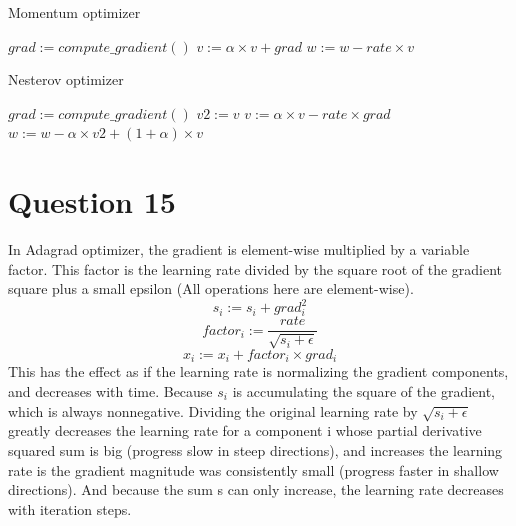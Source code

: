 \documentclass[10pt]{article}
\begin{document}
\begin{algorithm}
\caption{Momentum optimizer}\label{euclid}
\begin{algorithmic}[2]
\State $grad:=compute\_gradient()$
\State $v:=\alpha\times v+grad$
\State $w:=w-rate\times v$
\EndProcedure
\end{algorithmic}
\end{algorithm}

\begin{algorithm}
\caption{Nesterov optimizer}\label{euclid}
\begin{algorithmic}[2]
\State $grad:=compute\_gradient()$
\State $v2:=v$
\State $v:=\alpha\times v-rate\times grad$
\State $w:=w-\alpha\times v2+(1+\alpha)\times v$
\EndProcedure
\end{algorithmic}
\end{algorithm}

\section{Question 15}
In Adagrad optimizer, the gradient is element-wise multiplied by a variable factor. This factor is the learning rate divided by the square root of the gradient square plus a small epsilon (All operations here are element-wise).
\[	s_{i}:=s_{i}+grad_{i}^2\]
\[	factor_i:=\frac{rate}{\sqrt{s_{i}+\epsilon}}\]
\[	x_{i}:=x_{i}+factor_i\times grad_{i}\]
This has the effect as if the learning rate is normalizing the gradient components, and decreases with time. Because $s_i$ is accumulating the square of the gradient, which is always nonnegative. Dividing the original learning rate by $\sqrt{s_i+\epsilon}$ greatly decreases the learning rate for a component i whose partial derivative squared sum is big (progress slow in steep directions), and increases the learning rate is the gradient magnitude was consistently small (progress faster in shallow directions). And because the sum s can only increase, the learning rate decreases with iteration steps.
\end{document}
